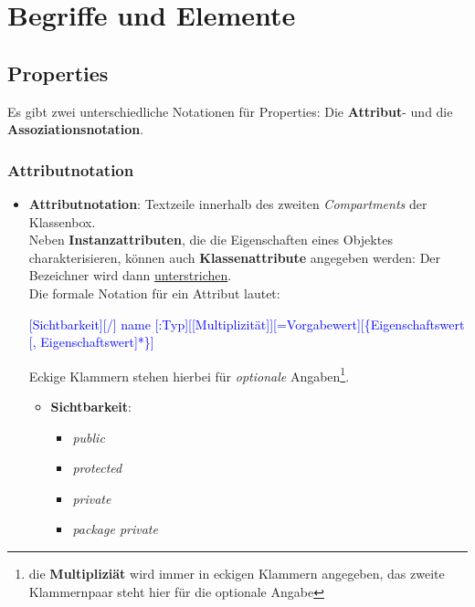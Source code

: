 \section{Begriffe und Elemente}\label{sec:klassendiagramme-begriffe-und-elemente}

\subsection{Properties}
Es gibt zwei unterschiedliche Notationen für Properties: Die \textbf{Attribut}- und die \textbf{Assoziationsnotation}.

\subsubsection*{Attributnotation}

\begin{itemize}
    \item \textbf{Attributnotation}: Textzeile innerhalb des zweiten \textit{Compartments} der Klassenbox.\\
    Neben \textbf{Instanzattributen}, die die Eigenschaften eines Objektes charakterisieren, können auch \textbf{Klassenattribute} angegeben werden: Der Bezeichner wird dann \underline{unterstrichen}.\\
    Die formale Notation für ein Attribut lautet:\\
    \medskip
     \noindent
    \begin{small}
        \textcolor{blue}{[Sichtbarkeit][/] name [:Typ][[Multiplizität]][=Vorgabewert][\{Eigenschaftswert [, Eigenschaftswert]*\}]}\\
    \end{small}
    \noindent
    Eckige Klammern stehen hierbei für \textit{optionale} Angaben\footnote{
        die \textbf{Multipliziät} wird immer in eckigen Klammern angegeben, das zweite Klammernpaar steht hier für die optionale Angabe
    }.
    \begin{itemize}
        \item \textbf{Sichtbarkeit}:
            \begin{itemize}
                \item \code{+} \textit{public}
                \item \code{#} \textit{protected}
                \item \code{-} \textit{private}
                \item \code{~} \textit{package private}
            \end{itemize}

\end{itemize}
\end{itemize}
